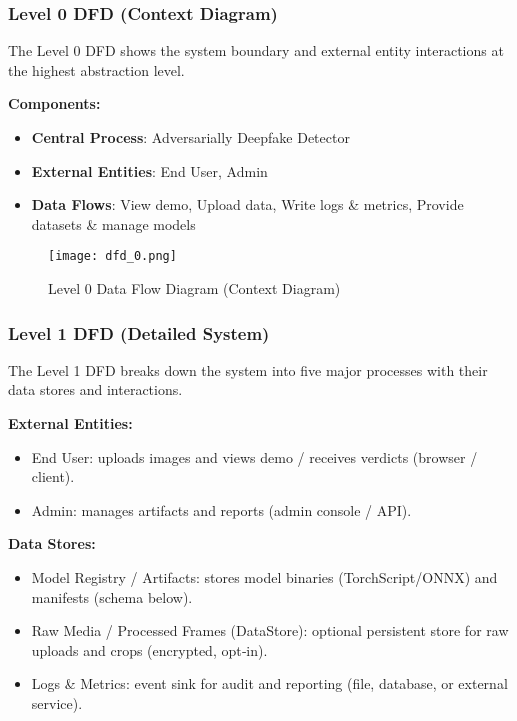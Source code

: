 \documentclass[a4paper,12pt]{article}
\begin{document}
\subsubsection{Level 0 DFD (Context Diagram)}
The Level 0 DFD shows the system boundary and external entity interactions at the highest abstraction level.

\textbf{Components:}
\begin{itemize}
    \item \textbf{Central Process}: Adversarially Deepfake Detector
    \item \textbf{External Entities}: End User, Admin
    \item \textbf{Data Flows}: View demo, Upload data, Write logs & metrics, Provide datasets & manage models
\end{itemize}

\begin{figure}[h]
    \centering
     \texttt{[image: dfd\_0.png]}
    \caption{Level 0 Data Flow Diagram (Context Diagram)}
    \label{fig:dfd0}
\end{figure}

\clearpage

\subsubsection{Level 1 DFD (Detailed System)}
The Level 1 DFD breaks down the system into five major processes with their data stores and interactions.

\textbf{External Entities:}
\begin{itemize}
    \item End User: uploads images and views demo / receives verdicts (browser / client).
    \item Admin: manages artifacts and reports (admin console / API).
\end{itemize}

\textbf{Data Stores:}
\begin{itemize}
    \item Model Registry / Artifacts: stores model binaries (TorchScript/ONNX) and manifests (schema below).
    \item Raw Media / Processed Frames (DataStore): optional persistent store for raw uploads and crops (encrypted, opt‑in).
    \item Logs & Metrics: event sink for audit and reporting (file, database, or external service).
\end{itemize}
\end{document}
